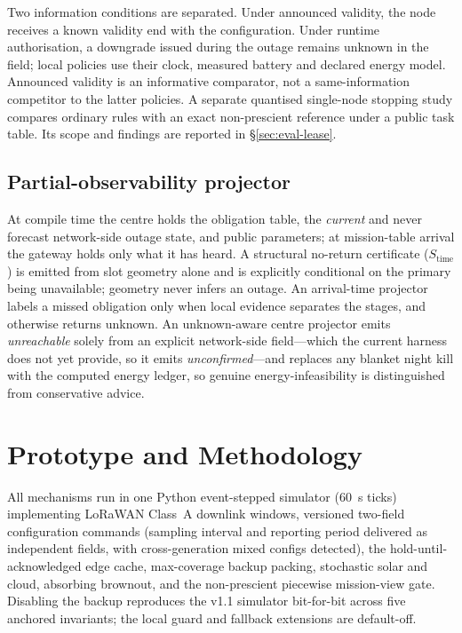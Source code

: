 \documentclass[journal,10pt]{IEEEtran}
\newcommand{\stime}{$S_{\mathrm{time}}$\xspace}
\begin{document}
Two information conditions are separated. Under announced validity, the node receives a known
validity end with the configuration. Under runtime authorisation, a downgrade issued during the
outage remains unknown in the field; local policies use their clock, measured battery and
declared energy model. Announced validity is an informative comparator, not a same-information
competitor to the latter policies. A separate quantised single-node stopping study compares
ordinary rules with an exact non-prescient reference under a public task table. Its scope and
findings are reported in \S\ref{sec:eval-lease}.

\subsection{Partial-observability projector}
\label{sec:mech-projector}
At compile time the centre holds the obligation table, the \emph{current} and never forecast
network-side outage state, and public parameters; at mission-table arrival the gateway holds only
what it has heard. A structural no-return certificate (\stime) is emitted from slot geometry alone
and is explicitly conditional on the primary being unavailable; geometry never infers an outage.
An arrival-time projector labels a missed obligation only when local evidence separates the
stages, and otherwise returns unknown. An unknown-aware centre projector emits \emph{unreachable}
solely from an explicit network-side field---which the current harness does not yet provide, so it
emits \emph{unconfirmed}---and replaces any blanket night kill with the computed energy ledger, so
genuine energy-infeasibility is distinguished from conservative advice.

\section{Prototype and Methodology}
\label{sec:proto}

All mechanisms run in one Python event-stepped simulator (60~s ticks) implementing LoRaWAN Class~A
downlink windows, versioned two-field configuration commands (sampling interval and reporting
period delivered as independent fields, with cross-generation mixed configs detected), the
hold-until-acknowledged edge cache, max-coverage backup packing, stochastic solar and cloud,
absorbing brownout, and the non-prescient piecewise mission-view gate. Disabling the backup
reproduces the v1.1 simulator bit-for-bit across five anchored invariants; the local guard and
fallback extensions are default-off.
\end{document}
